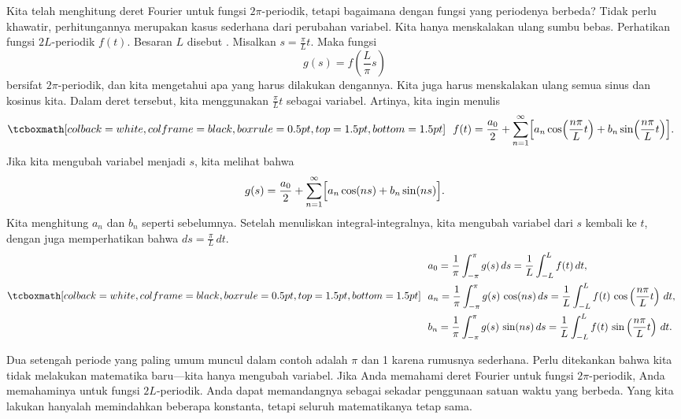 Kita telah menghitung deret Fourier untuk fungsi $2\pi$-periodik, tetapi bagaimana
dengan fungsi yang periodenya berbeda?  Tidak perlu khawatir, perhitungannya merupakan
kasus sederhana dari perubahan variabel.  Kita hanya menskalakan ulang sumbu
bebas.  Perhatikan fungsi $2L$-periodik $f(t)$.  Besaran $L$ disebut
\emph{}.  Misalkan $s = \frac{\pi}{L}  t$.
Maka fungsi
\begin{equation*}
g(s) = f\left(\frac{L}{\pi} s \right)
\end{equation*}
bersifat $2\pi$-periodik, dan kita mengetahui apa yang harus dilakukan dengannya.
Kita juga harus menskalakan ulang semua sinus dan kosinus kita.
Dalam deret tersebut, kita menggunakan $\frac{\pi}{L} t$ sebagai variabel.  Artinya, kita
ingin menulis
\begin{equation*}
\mybxbg{~~
f(t) = 
\frac{a_0}{2} +
\sum_{n=1}^\infty
\Bigl[
a_n \cos \Bigl( \frac{n \pi}{L} t \Bigr)
+ b_n \sin \Bigl(\frac{n \pi}{L} t \Bigr)
\Bigr] .
~~}
\end{equation*}
Jika kita mengubah variabel menjadi $s$, kita melihat bahwa
\begin{equation*}
g(s) = 
\frac{a_0}{2} +
\sum_{n=1}^\infty
\Bigl[
a_n \cos (n s)
+ b_n \sin (n s)
\Bigr] .
\end{equation*}
Kita menghitung $a_n$ dan $b_n$ seperti sebelumnya.  Setelah menuliskan
integral-integralnya, kita mengubah variabel dari $s$ kembali ke $t$, dengan juga memperhatikan
bahwa $ds = \frac{\pi}{L} \, dt$.
\begin{equation*}
\mybxbg{~~
\begin{aligned}
& a_0 =
\frac{1}{\pi}
\int_{-\pi}^\pi
g(s) \, ds
=
\frac{1}{L}
\int_{-L}^L
f(t) \, dt , \\
& a_n =
\frac{1}{\pi}
\int_{-\pi}^\pi
g(s) \, \cos (n s) \, ds
=
\frac{1}{L}
\int_{-L}^L
f(t) \, \cos \left( \frac{n \pi}{L} t \right) \, dt , \\
& b_n =
\frac{1}{\pi}
\int_{-\pi}^\pi
g(s) \, \sin (n s) \, ds
=
\frac{1}{L}
\int_{-L}^L
f(t) \, \sin \left( \frac{n \pi}{L} t \right) \, dt .
\end{aligned}
~~}
\end{equation*}

Dua setengah periode yang paling umum muncul dalam contoh
adalah $\pi$ dan 1 karena rumusnya sederhana.  Perlu ditekankan bahwa kita
tidak melakukan matematika baru---kita hanya mengubah variabel.
Jika Anda memahami
deret Fourier untuk fungsi $2\pi$-periodik, Anda memahaminya untuk
fungsi $2L$-periodik.  Anda dapat memandangnya sebagai sekadar penggunaan
satuan waktu yang berbeda.  Yang kita lakukan hanyalah memindahkan beberapa konstanta,
tetapi seluruh matematikanya tetap sama.

